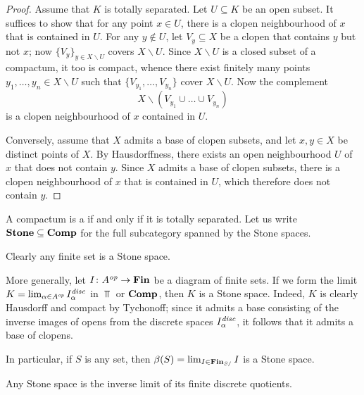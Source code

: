 \begin{proof}
	Assume that $ K $ is totally separated.
	Let $ U \subseteq K $ be an open subset.
	It suffices to show that for any point $ x \in U $, there is a clopen neighbourhood of $ x $ that is contained in $ U $.
	For any $ y \notin U $, let $ V_y \subseteq X $ be a clopen that contains $ y $ but not $ x $;
	now $ \{ V_y \}_{y \in X \smallsetminus U} $ covers $ X \smallsetminus U $.
	Since $ X \smallsetminus U $ is a closed subset of a compactum, it too is compact, whence there exist finitely many points $ y_1, \dots, y_n \in X \smallsetminus U $ such that $ \{ V_{y_1}, \dots, V_{y_n} \} $ cover $ X \smallsetminus U $.
	Now the complement 
	\[
		X \smallsetminus (V_{y_1} \cup \dots \cup V_{y_n})
	\]
	is a clopen neighbourhood of $ x $ contained in $ U $.

	Conversely, assume that $ X $ admits a base of clopen subsets, and let $ x, y \in X $ be distinct points of $ X $.
	By Hausdorffness, there exists an open neighbourhood $ U $ of $ x $ that does not contain $ y $. 
	Since $ X $ admits a base of clopen subsets, there is a clopen neighbourhood of $ x $ that is contained in $ U $, which therefore does not contain $ y $.
\end{proof}

\begin{dfn}
	A compactum is a  if and only if it is totally separated.
	Let us write $ \textbf{\textup{Stone}} \subseteq \textbf{\textup{Comp}} $ for the full subcategory spanned by the Stone spaces.
\end{dfn}

\begin{exm}
	Clearly any finite set is a Stone space.

	More generally, let $ I \colon A^{\textit{op}} \to \textbf{\textup{Fin}} $ be a diagram of finite sets.
	If we form the limit $ K = \lim_{\alpha \in A^{\textit{op}}} I_{\alpha}^{\textit{disc}}$ in $ \Top $ or $ \textbf{\textup{Comp}} $, then $ K $ is a Stone space.
	Indeed, $ K $ is clearly Hausdorff and compact by Tychonoff;
	since it admits a base consisting of the inverse images of opens from the discrete spaces $ I_{\alpha}^{\textit{disc}} $, it follows that it admits a base of clopens.

	In particular, if $ S $ is any set, then $ \beta(S) = \lim_{I \in \textbf{\textup{Fin}}_{S/}} I $ is a Stone space.
\end{exm}

\begin{lem}
	Any Stone space is the inverse limit of its finite discrete quotients.
\end{lem}

